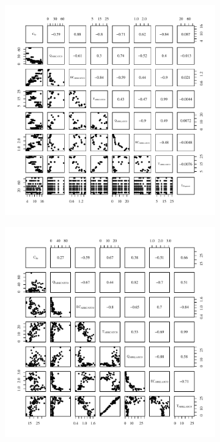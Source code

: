 \subfiguremid
\begin{landscape}
	\begin{figure}
		\begin{subfigure}{0.7\textwidth}
			\centering
			\includegraphics[width=\tableCustomSize]{"Figures/Results_USR/Stochastic/Conc Model Full PairsUDIV"}
		\end{subfigure}%
		\begin{subfigure}{0.7\textwidth}
			\centering			
			\includegraphics[width=\tableCustomSize]{"Figures/Results_USR/Stochastic/Conc Model Full PairsWTP"}

\end{subfigure}
\end{figure}
\end{landscape}
